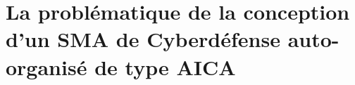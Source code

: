 \documentclass[ twoside,openright,titlepage,numbers=noenddot,headinclude,%
                footinclude=true,cleardoublepage=empty,abstractoff, %
                BCOR=5mm,paper=a4,fontsize=11pt,%
                french,american,%
                ]{scrreprt}
\begin{document}
\section{La problématique de la conception d'un SMA de Cyberdéfense auto-organisé de type AICA}\label{sec:problematique-sma-aica}

\end{document}
